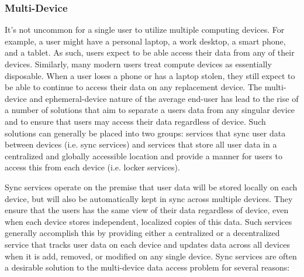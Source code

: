 \subsubsection{Multi-Device}
It's not uncommon for a single user to utilize multiple computing
devices. For example, a user might have a personal laptop, a work
desktop, a smart phone, and a tablet. As such, users expect to be able
access their data from any of their devices. Similarly, many modern
users treat compute devices as essentially disposable. When a user
loses a phone or has a laptop stolen, they still expect to be able to
continue to access their data on any replacement device. The
multi-device and ephemeral-device nature of the average end-user has
lead to the rise of a number of solutions that aim to separate a users
data from any singular device and to ensure that users may access
their data regardless of device. Such solutions can generally be
placed into two groups: services that sync user data between devices
(i.e. sync services) and services that store all user data in a
centralized and globally accessible location and provide a manner for
users to access this from each device (i.e. locker services).

Sync services operate on the premise that user data will be stored
locally on each device, but will also be automatically kept in sync
across multiple devices. They ensure that the users has the same view
of their data regardless of device, even when each device stores
independent, localized copies of this data. Such services generally
accomplish this by providing either a centralized or a decentralized
service that tracks user data on each device and updates data across
all devices when it is add, removed, or modified on any single
device. Sync services are often a desirable solution to the
multi-device data access problem for several reasons:

